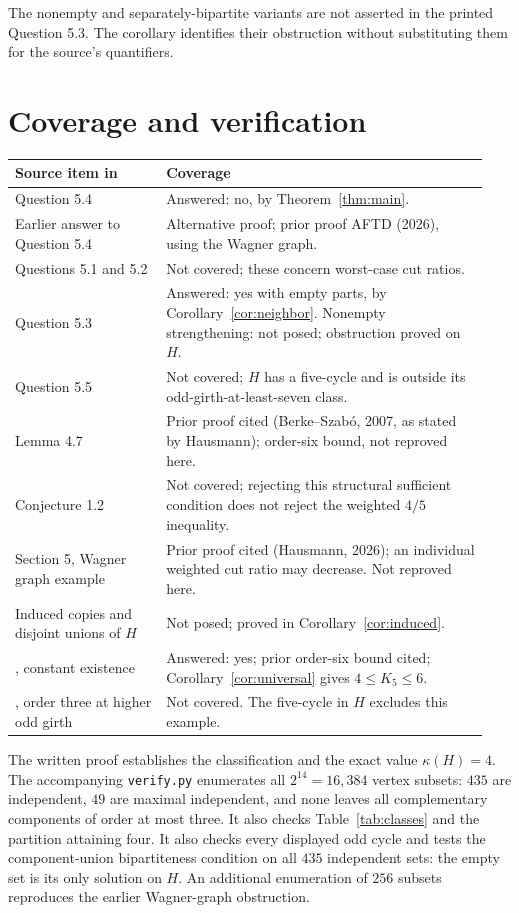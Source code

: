 \documentclass[11pt]{article}
\begin{document}
The nonempty and separately-bipartite variants are not asserted in the
printed Question 5.3. The corollary identifies their obstruction without
substituting them for the source's quantifiers.

\section{Coverage and verification}
\begin{center}
\small
\begin{tabular}{@{}>{\raggedright\arraybackslash}p{0.30\linewidth}>{\raggedright\arraybackslash}p{0.64\linewidth}@{}}
\toprule
Source item in \cite{hausmann} & Coverage\\
\midrule
Question 5.4 & Answered: no, by Theorem~\ref{thm:main}.\\
Earlier answer to Question 5.4 & Alternative proof; prior proof
AFTD (2026), using the Wagner graph.\\
Questions 5.1 and 5.2 & Not covered; these concern worst-case cut ratios.\\
Question 5.3 & Answered: yes with empty parts, by
Corollary~\ref{cor:neighbor}. Nonempty strengthening: not posed;
obstruction proved on $H$.\\
Question 5.5 & Not covered; $H$ has a five-cycle and is outside its
odd-girth-at-least-seven class.\\
Lemma 4.7 & Prior proof cited (Berke--Szab\'o, 2007, as stated by
Hausmann); order-six bound, not reproved here.\\
Conjecture 1.2 & Not covered; rejecting this structural sufficient
condition does not reject the weighted $4/5$ inequality.\\
Section 5, Wagner graph example & Prior proof cited (Hausmann, 2026);
an individual weighted cut ratio may decrease. Not reproved here.\\
Induced copies and disjoint unions of $H$ & Not posed; proved in
Corollary~\ref{cor:induced}.\\
\cite[Section 5, item 2]{aftd}, constant existence & Answered: yes;
prior order-six bound cited; Corollary~\ref{cor:universal} gives
$4\leq K_5\leq6$.\\
\cite[Section 5, item 3]{aftd}, order three at higher odd girth &
Not covered. The five-cycle in $H$ excludes this example.\\
\bottomrule
\end{tabular}
\end{center}

The written proof establishes the classification and the exact value
$\kappa(H)=4$. The accompanying \texttt{verify.py} enumerates all
$2^{14}=16{,}384$ vertex subsets: $435$ are independent, $49$ are
maximal independent, and none leaves all complementary components of
order at most three. It also checks Table~\ref{tab:classes} and the
partition attaining four.
It also checks every displayed odd cycle and tests the component-union
bipartiteness condition on all $435$ independent sets: the empty set
is its only solution on $H$.
An additional enumeration of $256$ subsets reproduces the earlier
Wagner-graph obstruction.
\end{document}
